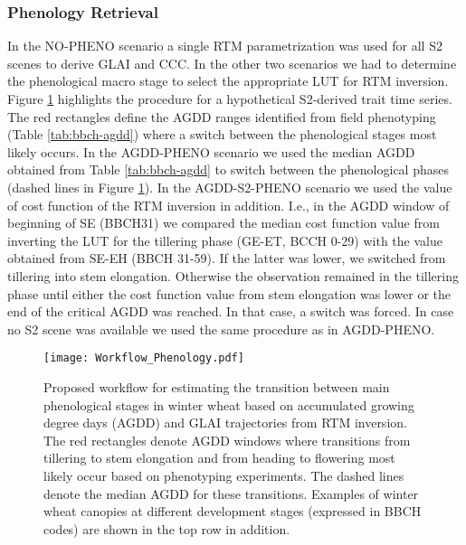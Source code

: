 \subsubsection{Phenology Retrieval}
\label{subsubsec:pheno-from-s2}
In the NO-PHENO scenario a single RTM parametrization was used for all S2 scenes to derive GLAI and CCC. In the other two scenarios we had to determine the phenological macro stage to select the appropriate LUT for RTM inversion. Figure \ref{fig:workflow-phenology} highlights the procedure for a hypothetical S2-derived trait time series. The red rectangles define the AGDD ranges identified from field phenotyping (Table \ref{tab:bbch-agdd}) where a switch between the phenological stages most likely occurs. In the AGDD-PHENO scenario we used the median AGDD obtained from Table \ref{tab:bbch-agdd} to switch between the phenological phases (dashed lines in Figure \ref{fig:workflow-phenology}). In the AGDD-S2-PHENO scenario we used the value of cost function of the RTM inversion in addition. I.e., in the AGDD window of beginning of SE (BBCH31) we compared the median cost function value from inverting the LUT for the tillering phase (GE-ET, BCCH 0-29) with the value obtained from SE-EH (BBCH 31-59). If the latter was lower, we switched from tillering into stem elongation. Otherwise the observation remained in the tillering phase until either the cost function value from stem elongation was lower or the end of the critical AGDD was reached. In that case, a switch was forced. In case no S2 scene was available we used the same procedure as in AGDD-PHENO.

\begin{figure}[H]
    \centering
    \texttt{[image: Workflow\_Phenology.pdf]}
    \caption[Proposed workflow for estimating the transition between main phenological stages in winter wheat based on accumulated growing degree days (AGDD) and GLAI trajectories from RTM inversion. The red rectangles denote AGDD windows where transitions from tillering to stem elongation and from heading to flowering most likely occur based on phenotyping experiments. The dashed lines denote the median AGDD for these transitions. Examples of winter wheat canopies at different development stages (expressed in BBCH codes) are shown in the top row in addition.]{Proposed workflow for estimating the transition between main phenological stages in winter wheat based on accumulated growing degree days (AGDD) and GLAI trajectories from RTM inversion. The red rectangles denote AGDD windows where transitions from tillering to stem elongation and from heading to flowering most likely occur based on phenotyping experiments. The dashed lines denote the median AGDD for these transitions. Examples of winter wheat canopies at different development stages (expressed in BBCH codes) are shown in the top row in addition.}
    \label{fig:workflow-phenology}
\end{figure}

